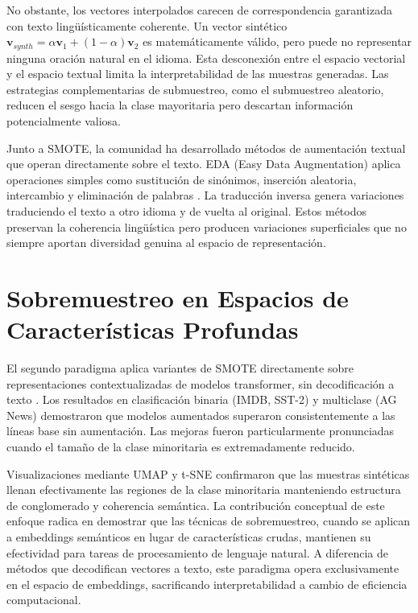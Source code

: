 No obstante, los vectores interpolados carecen de correspondencia garantizada con texto lingüísticamente coherente. Un vector sintético $\mathbf{v}_{synth} = \alpha \mathbf{v}_1 + (1-\alpha) \mathbf{v}_2$ es matemáticamente válido, pero puede no representar ninguna oración natural en el idioma. Esta desconexión entre el espacio vectorial y el espacio textual limita la interpretabilidad de las muestras generadas. Las estrategias complementarias de submuestreo, como el submuestreo aleatorio, reducen el sesgo hacia la clase mayoritaria pero descartan información potencialmente valiosa.

Junto a SMOTE, la comunidad ha desarrollado métodos de aumentación textual que operan directamente sobre el texto. EDA (Easy Data Augmentation) aplica operaciones simples como sustitución de sinónimos, inserción aleatoria, intercambio y eliminación de palabras \cite{wei2019eda}. La traducción inversa genera variaciones traduciendo el texto a otro idioma y de vuelta al original. Estos métodos preservan la coherencia lingüística pero producen variaciones superficiales que no siempre aportan diversidad genuina al espacio de representación.

\section{Sobremuestreo en Espacios de Características Profundas}

El segundo paradigma aplica variantes de SMOTE directamente sobre representaciones contextualizadas de modelos transformer, sin decodificación a texto \cite{synthetic2025feature}. Los resultados en clasificación binaria (IMDB, SST-2) y multiclase (AG News) demostraron que modelos aumentados superaron consistentemente a las líneas base sin aumentación. Las mejoras fueron particularmente pronunciadas cuando el tamaño de la clase minoritaria es extremadamente reducido.

Visualizaciones mediante UMAP y t-SNE confirmaron que las muestras sintéticas llenan efectivamente las regiones de la clase minoritaria manteniendo estructura de conglomerado y coherencia semántica. La contribución conceptual de este enfoque radica en demostrar que las técnicas de sobremuestreo, cuando se aplican a embeddings semánticos en lugar de características crudas, mantienen su efectividad para tareas de procesamiento de lenguaje natural. A diferencia de métodos que decodifican vectores a texto, este paradigma opera exclusivamente en el espacio de embeddings, sacrificando interpretabilidad a cambio de eficiencia computacional.

